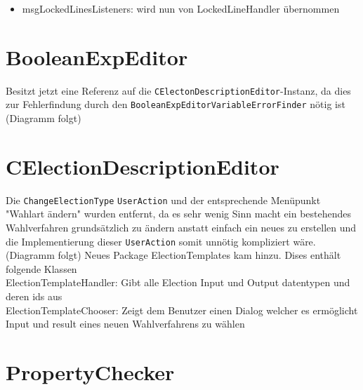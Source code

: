 \documentclass[a4paper]{scrreprt}
\begin{document}
\begin{itemize}
\item msgLockedLinesListeners: wird nun von LockedLineHandler übernommen
\end{itemize}

\section{BooleanExpEditor}
Besitzt jetzt eine Referenz auf die \verb!CElectonDescriptionEditor!-Instanz, da dies zur Fehlerfindung durch den \verb!BooleanExpEditorVariableErrorFinder! nötig ist
\newline
(Diagramm folgt)
\newline

\section{CElectionDescriptionEditor}

Die \verb!ChangeElectionType! \verb!UserAction! und der entsprechende Menüpunkt "Wahlart ändern" wurden entfernt, da es sehr wenig Sinn macht ein bestehendes Wahlverfahren grundsätzlich zu ändern anstatt einfach ein neues zu erstellen und die Implementierung dieser \verb!UserAction! somit unnötig kompliziert wäre.
\newline
(Diagramm folgt)
\newline
Neues Package ElectionTemplates kam hinzu. Dises enthält folgende Klassen\\
ElectionTemplateHandler: Gibt alle Election Input und Output datentypen und deren ids aus\\
ElectionTemplateChooser: Zeigt dem Benutzer einen Dialog welcher es ermöglicht Input und result eines neuen Wahlverfahrens zu wählen

\section{PropertyChecker}
\end{document}
